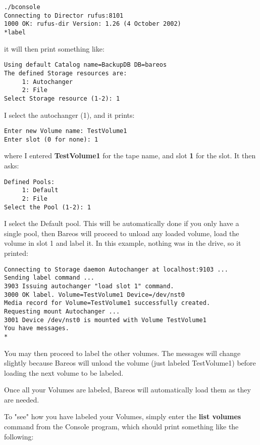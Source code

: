 \footnotesize
\begin{verbatim}
./bconsole
Connecting to Director rufus:8101
1000 OK: rufus-dir Version: 1.26 (4 October 2002)
*label
\end{verbatim}
\normalsize

it will then print something like:

\footnotesize
\begin{verbatim}
Using default Catalog name=BackupDB DB=bareos
The defined Storage resources are:
     1: Autochanger
     2: File
Select Storage resource (1-2): 1
\end{verbatim}
\normalsize

I select the autochanger (1), and it prints:

\footnotesize
\begin{verbatim}
Enter new Volume name: TestVolume1
Enter slot (0 for none): 1
\end{verbatim}
\normalsize

where I entered {\bf TestVolume1} for the tape name, and slot {\bf 1} for the
slot. It then asks:

\footnotesize
\begin{verbatim}
Defined Pools:
     1: Default
     2: File
Select the Pool (1-2): 1
\end{verbatim}
\normalsize

I select the Default pool. This will be automatically done if you only have a
single pool, then Bareos will proceed to unload any loaded volume, load the
volume in slot 1 and label it. In this example, nothing was in the drive, so
it printed:

\footnotesize
\begin{verbatim}
Connecting to Storage daemon Autochanger at localhost:9103 ...
Sending label command ...
3903 Issuing autochanger "load slot 1" command.
3000 OK label. Volume=TestVolume1 Device=/dev/nst0
Media record for Volume=TestVolume1 successfully created.
Requesting mount Autochanger ...
3001 Device /dev/nst0 is mounted with Volume TestVolume1
You have messages.
*
\end{verbatim}
\normalsize

You may then proceed to label the other volumes. The messages will change
slightly because Bareos will unload the volume (just labeled TestVolume1)
before loading the next volume to be labeled.

Once all your Volumes are labeled, Bareos will automatically load them as they
are needed.

To "see" how you have labeled your Volumes, simply enter the {\bf list
volumes} command from the Console program, which should print something like
the following:


